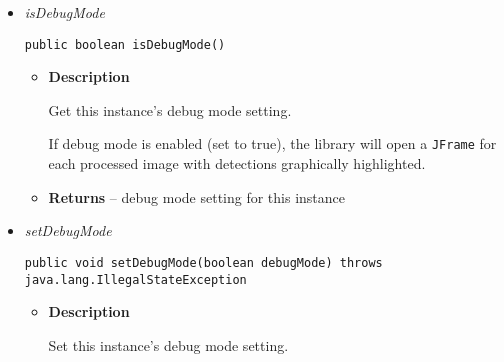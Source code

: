 {{{{\begin{itemize}
{\begin{itemize}
{Get the \textit{minimalConfidence} setting for this instance.

Minimal Confidence score is used as a confidence boundary during the process of object detection. An object that has been detected with a confidence score lower than \textit{ minimalConfidence} is ignored. An object that has been detected with a confidence score higher or equal than \textit{ minimalConfidence} is added to the final result list.
}
\item{{\bf  Returns} -- 
This instance's \textit{minimalConfidence} setting. 
}%
\end{itemize}
}%
\item{ 
{\textit{isDebugMode}}\\
\begin{lstlisting}[frame=none]
public boolean isDebugMode()\end{lstlisting} %
\begin{itemize}
\item{
{\bf  Description}



Get this instance's debug mode setting.

If debug mode is enabled (set to true), the library will open a \texttt{\small JFrame}{\small 
{}} for each processed image with detections graphically highlighted.
}
\item{{\bf  Returns} -- 
debug mode setting for this instance 
}%
\end{itemize}
}%
\item{ 
{\textit{setDebugMode}}\\
\begin{lstlisting}[frame=none]
public void setDebugMode(boolean debugMode) throws java.lang.IllegalStateException\end{lstlisting} %
\begin{itemize}
\item{
{\bf  Description}



Set this instance's debug mode setting.

}
\end{itemize}}
\end{itemize}}}}}
